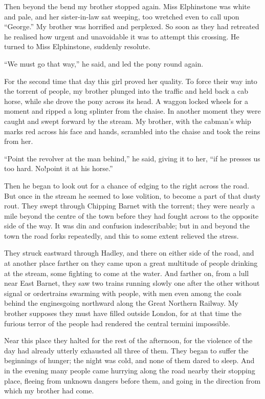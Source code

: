 Then beyond the bend my brother stopped again. Miss Elphinstone was
white and pale, and her sister-in-law sat weeping, too wretched
even to call upon ``George.'' My brother was horrified and perplexed.
So soon as they had retreated he realised how urgent and
unavoidable it was to attempt this crossing. He turned to Miss
Elphinstone, suddenly resolute.

``We must go that way,'' he said, and led the pony round again.

For the second time that day this girl proved her quality. To force
their way into the torrent of people, my brother plunged into the
traffic and held back a cab horse, while she drove the pony across
its head. A waggon locked wheels for a moment and ripped a long
splinter from the chaise. In another moment they were caught and
swept forward by the stream. My brother, with the cabman's whip
marks red across his face and hands, scrambled into the chaise and
took the reins from her.

``Point the revolver at the man behind,'' he said, giving it to her,
``if he presses us too hard. No!\dash{}point it at his horse.''

Then he began to look out for a chance of edging to the right
across the road. But once in the stream he seemed to lose volition,
to become a part of that dusty rout. They swept through Chipping
Barnet with the torrent; they were nearly a mile beyond the centre
of the town before they had fought across to the opposite side of
the way. It was din and confusion indescribable; but in and beyond
the town the road forks repeatedly, and this to some extent
relieved the stress.

They struck eastward through Hadley, and there on either side of
the road, and at another place farther on they came upon a great
multitude of people drinking at the stream, some fighting to come
at the water. And farther on, from a lull near East Barnet, they
saw two trains running slowly one after the other without signal or
order\dash{}trains swarming with people, with men even among the coals
behind the engines\dash{}going northward along the Great Northern
Railway. My brother supposes they must have filled outside London,
for at that time the furious terror of the people had rendered the
central termini impossible.

Near this place they halted for the rest of the afternoon, for the
violence of the day had already utterly exhausted all three of
them. They began to suffer the beginnings of hunger; the night was
cold, and none of them dared to sleep. And in the evening many
people came hurrying along the road nearby their stopping place,
fleeing from unknown dangers before them, and going in the
direction from which my brother had come.

